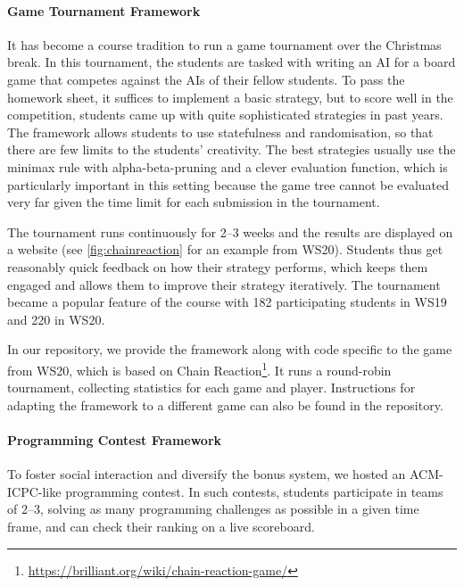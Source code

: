 \paragraph{Game Tournament Framework}
It has become a course tradition to run a game tournament over the Christmas break.
In this tournament, the students are tasked with writing an AI for a board game that competes against the AIs of their fellow students.
To pass the homework sheet, it suffices to implement a basic strategy, but to score well in the competition, students came up with quite sophisticated strategies in past years.
The framework allows students to use statefulness and randomisation, so that there are few limits to the students' creativity.
The best strategies usually use the minimax rule with alpha-beta-pruning and a clever evaluation function, which is particularly important in this setting because the game tree cannot be evaluated very far given the time limit for each submission in the tournament.

The tournament runs continuously for 2--3 weeks and the results are displayed on a website (see \cref{fig:chainreaction} for an example from WS20).
Students thus get reasonably quick feedback on how their strategy performs,
which keeps them engaged and allows them to improve their strategy iteratively.
The tournament became a popular feature of the course with 182 participating students in WS19 and 220 in WS20.

In our repository, we provide the framework along with code specific to the game from WS20, which is based on Chain Reaction\footnote{\url{ https://brilliant.org/wiki/chain-reaction-game/}}.
It runs a round-robin tournament,
collecting statistics for each game and player.
Instructions for adapting the framework to a different game can also be found in the repository.

\paragraph{Programming Contest Framework}\label{sec:contest}
To foster social interaction and diversify the bonus system,
we hosted an ACM-ICPC-like programming contest.
In such contests, students
participate in teams of 2--3,
solving as many programming challenges as possible in a given time frame,
and can check their ranking on a live scoreboard.


